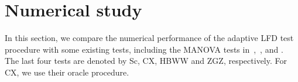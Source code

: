 \documentclass[12pt]{article} %
\DeclareMathOperator{\mytr}{tr}
\DeclareMathOperator{\myE}{E}
\newcommand{\bX}{\mathbf{X}}
\newcommand{\bfsym}[1]{\ensuremath{\boldsymbol{#1}}}
\def\bSigma {\bfsym {\Sigma}}
\def\bTheta {\bfsym {\Theta}}
\theoremstyle{definition}
\begin{document}
%






\section{Numerical study}\label{numerical}

In this section, we compare the numerical performance of the adaptive LFD test procedure with some existing tests, including the MANOVA tests in~\citet{Schott2007Some},~\citet{Cai2014High}, \cite{Hu2017} and \cite{ZHANG2017200}.
The last four tests are denoted by Sc, CX, HBWW and ZGZ, respectively.
For CX, we use their oracle procedure.
\end{document}
